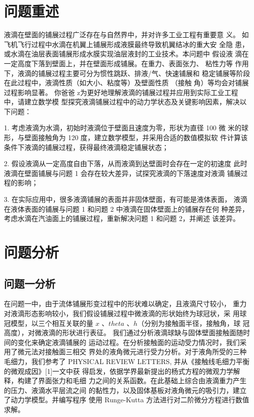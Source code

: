 \documentclass{cumcmthesis}
\begin{document}
\section{问题重述}
液滴在壁面的铺展过程广泛存在与自然界中，并对许多工业工程有重要意
义。 如飞机飞行过程中水滴在机翼上铺展形成液膜最终导致机翼结冰的重大安
全隐 患，或水滴在油层表面铺展形成水膜实现油层液封的工业技术。本问题中
假设液 滴在一定高度下落到壁面上，并在壁面形成铺展。在重力、表面张力、
粘性力等 作用下，液滴的铺展过程主要可分为惯性跳跃、排液/气、快速铺展和
稳定铺展等阶段在此过程中，液滴性质（如大小、粘度等）及壁面性质 （接触
角）等均会对铺展过程影响显著。     你爸爸 
 z为更好地理解液滴的铺展过程并应用到实际工业工程中，请建立数学模 
型探究液滴铺展过程中的动力学状态及关键影响因素，解决以下问题： 

1. 考虑液滴为水滴，初始时液滴位于壁面且速度为零，形状为直径 100 微
米的球形，与壁面接触角为 120 度，建立数学模型，并采用合适的数值模拟软
件计算该条件下液滴的铺展过程，获得最终液滴稳定铺展状态； 

2. 假设液滴从一定高度自由下落，从而液滴到达壁面时会存在一定的初速度
此时液滴在壁面铺展与问题 1 会存在较大差异，试探究液滴的下落速度对液滴
铺展过程的影响； 

3. 在实际应用中，很多液滴铺展的表面并非固体壁面，有可能是液体表面，
液滴在液体表面的铺展与问题 1 和问题 2 中液滴在固体壁面上的铺展存在何
种差异，考虑水滴在汽油面上的铺展过程，重新解决问题 1 和问题 2，并阐述 
该差异。
\section{问题分析}
\subsection{问题一分析}
在问题一中，由于流体铺展形变过程中的形状难以确定，且液滴尺寸较小，
重力对液滴形态影响较小，我们假设铺展过程中微液滴的形状始终为球冠状，采
用球冠模型，以三个相互关联的量 $x$ 、$theta$ 、$h$（分别为接触面半径，接触角，球
冠高度），对微液滴的形状进行表征。 
我们通过分析液滴球缺与固体壁面接触面随时间的变化来确定液滴铺展的
运动过程。在分析接触面的运动受力情况时，我们采用了微元法对接触面三相交
界处的液角微元进行受力分析。对于液角所受的三种毛细力，我们参考了
PHYSICAL REVIEW LETTERS, 并从《接触线毛细力平衡的微观成因》[1]一文中获
得启发，依据学界最新提出的杨式方程的微观力学解释，构建了界面张力和毛细
力之间的关系函数。在此基础上综合由液滴重力产生的压力、液滴水平层流之间
的黏性力，以及固体基板对液角微元的吸引力，建立了动力学模型。并编写程序
使用 Runge-Kutta 方法进行对二阶微分方程进行数值求解。
\end{document}
